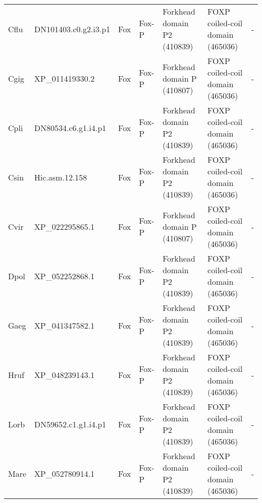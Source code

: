 \documentclass[../main.tex]{subfiles}
\begin{document}
\begin{landscape}
\begin{longtable}{lllllll}
		Cflu           & DN101403.c0.g2.i3.p1  & Fox            & Fox-P               & Forkhead domain P2 (410839)                 & FOXP coiled-coil domain (465036)                                       & -                    \\
		Cgig           & XP\_011419330.2       & Fox            & Fox-P               & Forkhead domain P (410807)                  & FOXP coiled-coil domain (465036)                                       & -                    \\
		Cpli           & DN80534.c6.g1.i4.p1   & Fox            & Fox-P               & Forkhead domain P2 (410839)                 & FOXP coiled-coil domain (465036)                                       & -                    \\
		Csin           & Hic.asm.12.158        & Fox            & Fox-P               & Forkhead domain P2 (410839)                 & FOXP coiled-coil domain (465036)                                       & -                    \\
		Cvir           & XP\_022295865.1       & Fox            & Fox-P               & Forkhead domain P (410807)                  & FOXP coiled-coil domain (465036)                                       & -                    \\
		Dpol           & XP\_052252868.1       & Fox            & Fox-P               & Forkhead domain P2 (410839)                 & FOXP coiled-coil domain (465036)                                       & -                    \\
		Gaeg           & XP\_041347582.1       & Fox            & Fox-P               & Forkhead domain P2 (410839)                 & FOXP coiled-coil domain (465036)                                       & -                    \\
		Hruf           & XP\_048239143.1       & Fox            & Fox-P               & Forkhead domain P2 (410839)                 & FOXP coiled-coil domain (465036)                                       & -                    \\
		Lorb           & DN59652.c1.g1.i4.p1   & Fox            & Fox-P               & Forkhead domain P2 (410839)                 & FOXP coiled-coil domain (465036)                                       & -                    \\
		Mare           & XP\_052780914.1       & Fox            & Fox-P               & Forkhead domain P2 (410839)                 & FOXP coiled-coil domain (465036)                                       & -                    \\

\end{longtable}
\end{landscape}
\end{document}
